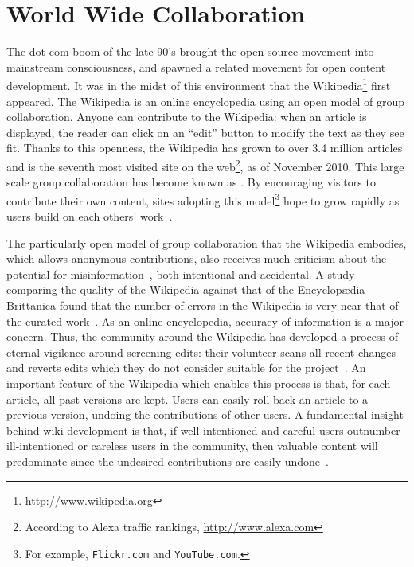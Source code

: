 \section{World Wide Collaboration}

The dot-com boom of the late 90's brought the open source movement into
mainstream consciousness, and spawned a related movement for open
content development.
It was in the midst of this environment that the
Wikipedia\footnote{\url{http://www.wikipedia.org}}
first appeared.
The Wikipedia
is an online encyclopedia using an open model of group collaboration.
Anyone can contribute to the Wikipedia: when an article is
displayed, the reader can click on an ``edit'' button to modify
the text as they see fit.
Thanks to this openness, the Wikipedia has grown to
over 3.4 million articles and is the seventh most visited site on the
web\footnote{According to Alexa traffic rankings, \url{http://www.alexa.com}},
as of November 2010.  
This large scale group collaboration
has become known as .
By encouraging visitors to contribute their own content,
sites adopting this model\footnote{For example,
\texttt{Flickr.com} and \texttt{YouTube.com}.}
hope to grow rapidly as users build on each others' work~\cite{Taylor2007}.



The particularly open model of group collaboration that the Wikipedia embodies,
which allows anonymous contributions,
also receives much criticism about the potential for
misinformation~\cite{Seigenthaler05,Stross2006,NewYorkTimes05a,TheSun06,NewZelandHerald06,BBC06,NewYorkTimes06,TheNewYorker06,BBC07},
both intentional and accidental.
A study comparing the quality of the Wikipedia against that
of the Encyclop{\ae}dia Brittanica found that the number of errors
in the Wikipedia is very near that of the curated work~\cite{Giles2005}.
As an online encyclopedia, accuracy of information is a major concern.
Thus, the community around the Wikipedia has developed a process
of eternal vigilence around screening edits: their volunteer  scans
all recent changes and reverts edits which they do not consider
suitable for the project~\cite{wiki:RCPatrol}.
An important feature of the Wikipedia which enables this
process is that, for each article,
all past versions are kept.
Users can easily roll back an article to a previous version,
undoing the contributions of other users.
A fundamental insight behind wiki development is that,
if well-intentioned and careful users outnumber ill-intentioned
or careless users in the community, then valuable content will predominate
since the undesired contributions are easily undone~\cite{Wikis01}.

